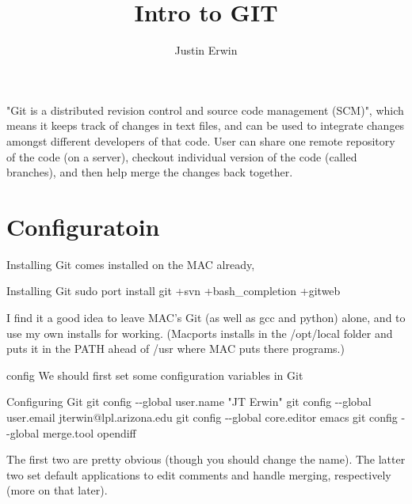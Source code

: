 \documentclass{beamer}
\begin{document}

\title[GIT]{Intro to GIT}

\author[Justin Erwin]{Justin Erwin}




\begin{frame}
	\titlepage
\end{frame}

\begin{frame}
"Git is a distributed revision control and source code management (SCM)", which means it keeps track of changes in text files, and can be used to integrate changes amongst different developers of that code. User can share one remote repository of the code (on a server), checkout individual version of the code (called branches), and then help merge the changes back together.
\end{frame}

\section{Configuratoin}
\begin{frame}{Installing}
Git comes installed on the MAC already, 
\begin{block}{Installing Git}
sudo port install git +svn +bash\_completion +gitweb
\end{block}
I find it a good idea to leave MAC's Git (as well as gcc and python) alone, and to use my own installs for working. (Macports installs in the /opt/local folder and puts it in the PATH ahead of /usr where MAC puts there programs.)
\end{frame}

\begin{frame}{config}
We should first set some configuration variables in Git
\begin{block}{Configuring Git}
git config -{}-global user.name "JT Erwin" \newline
git config -{}-global user.email jterwin@lpl.arizona.edu \newline
git config -{}-global core.editor emacs \newline
git config -{}-global merge.tool opendiff
\end{block}
The first two are pretty obvious (though you should change the name). The latter two set default applications to edit comments and handle merging, respectively (more on that later).
\end{frame}
\end{document}
